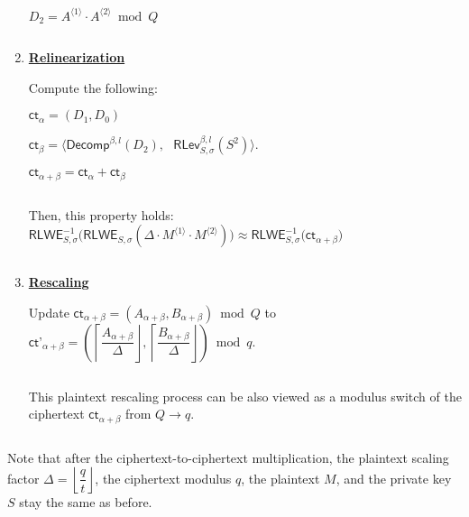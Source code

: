 \begin{tcolorbox}[title={\textbf{\tboxlabel{\ref*{subsubsec:bfv-mult-cipher-summary}} BFV's Ciphertext-to-Ciphertext Multiplication}}]
\begin{enumerate}
$D_2 = A^{\langle 1 \rangle} \cdot A^{\langle 2 \rangle} \bmod Q$


$ $

\item \textbf{\underline{Relinearization}} 


Compute the following:

$ \textsf{ct}_\alpha = (D
_1, D_0)$

$ \textsf{ct}_\beta = \bm{\langle} \textsf{Decomp}^{\beta, l}(D_2), \text{ } \textsf{RLev}_{S, \sigma}^{\beta, l}( S^2) \bm{\rangle}$.

$ \textsf{ct}_{\alpha + \beta} = \textsf{ct}_{\alpha} + \textsf{ct}_{\beta}$

$ $

Then, this property holds: $\textsf{RLWE}^{-1}_{S, \sigma}\bm(\textsf{RLWE}_{S, \sigma}(\Delta \cdot M^{\langle 1 \rangle} \cdot M^{\langle 2 \rangle})\bm) \approx \textsf{RLWE}^{-1}_{S, \sigma}\bm{(}\textsf{ct}_{\alpha + \beta}\bm)$

$ $




\item \textbf{\underline{Rescaling}}

Update $\textsf{ct}_{\alpha + \beta} = (A_{\alpha + \beta}, B_{\alpha + \beta}) \bmod Q$ to $\textsf{ct'}_{\alpha + \beta} = \left(\left\lceil\dfrac{A_{\alpha + \beta}}{\Delta}\right\rfloor, \left\lceil\dfrac{B_{\alpha + \beta}}{\Delta}\right\rfloor\right) \bmod q$. 

$ $

This plaintext rescaling process can be also viewed as a modulus switch of the ciphertext $\textsf{ct}_{\alpha + \beta}$ from $Q \rightarrow q$. 


$ $

\end{enumerate}

Note that after the ciphertext-to-ciphertext multiplication, the plaintext scaling factor $\Delta=\left\lfloor\dfrac{q}{t}\right\rfloor$, the ciphertext modulus $q$, the plaintext $M$, and the private key $S$ stay the same as before.



\end{tcolorbox}


